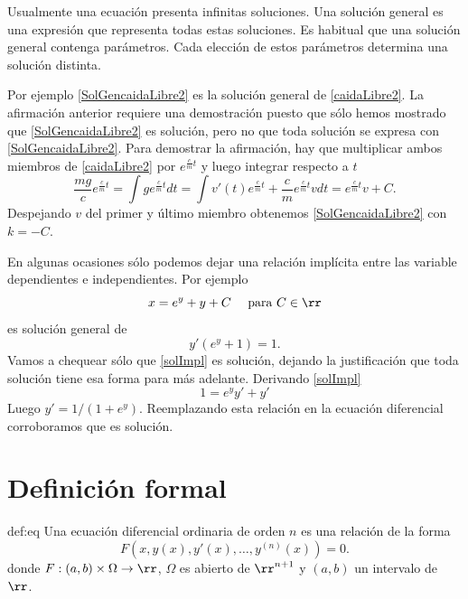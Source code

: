 \begin{definicion}{} Usualmente una ecuación presenta infinitas soluciones. Una solución general  es una expresión que representa todas estas soluciones. Es habitual que una solución general contenga parámetros. Cada elección de estos parámetros determina una solución distinta.
 \end{definicion}

 Por ejemplo \eqref{SolGencaidaLibre2} es la solución general de \eqref{caidaLibre2}.
  La afirmación anterior requiere una demostración puesto que sólo hemos mostrado que \eqref{SolGencaidaLibre2} es solución, pero no
que toda solución se expresa con \eqref{SolGencaidaLibre2}. Para demostrar la afirmación, hay que multiplicar ambos miembros de \eqref{caidaLibre2} 
por $e^{\frac{c}{m}t}$ y luego integrar respecto a $t$ 
\[\frac{mg}{c}e^{\frac{c}{m}t}=\int ge^{\frac{c}{m}t}dt=\int v'(t)e^{\frac{c}{m}t}+\frac{c}{m}e^{\frac{c}{m}t} vdt=e^{\frac{c}{m}t}v+C.\]
 Despejando $v$ del primer y último miembro obtenemos \eqref{SolGencaidaLibre2} con $k=-C$.

 




\begin{ejemplo}{} En algunas ocasiones sólo podemos dejar una relación implícita entre las variable dependientes e independientes. Por ejemplo
\begin{equation}\label{solImpl}x=e^y+y+C\quad\text{ para } C\in\rr\end{equation}
es solución general de
\[y'(e^y+1)=1.\]
Vamos a chequear sólo que \eqref{solImpl} es solución, dejando la justificación que toda solución tiene esa forma para más adelante. Derivando \eqref{solImpl}
\[ 1=e^yy'+y'\]
Luego $y'=1/(1+e^{y})$. Reemplazando esta relación  en la ecuación diferencial corroboramos que es solución.
\end{ejemplo}






\section{Definición formal}

\begin{definicion}{def:eq} Una ecuación diferencial
ordinaria de orden $n$ es una relación de la forma
\[\boxed{F(x,y(x),y'(x),\ldots,y^{(n)}(x))=0}.\]
donde $F:(a,b)\times \Omega\to\rr$, $\Omega$ es abierto de $\rr^{n+1}$ y $(a,b)$ un intervalo de $\rr$.
  \end{definicion}





